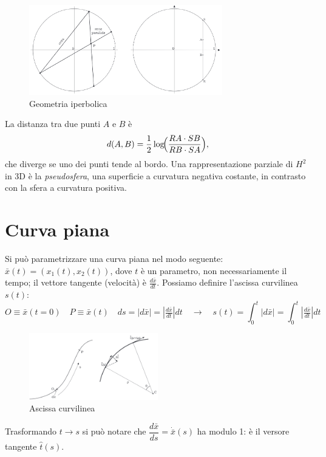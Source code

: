 \begin{figure}[H]
    \centering
    \includegraphics[width=0.75\textwidth]{assets/hyperbolic_geometry.png}
    \caption{Geometria iperbolica}
\end{figure}

La distanza tra due punti $A$ e $B$ è
$$
d(A,B) = \frac12 \log \!\Bigl(\frac{RA\cdot SB}{RB\cdot SA}\Bigr),
$$
che diverge se uno dei punti tende al bordo. Una rappresentazione parziale di $H^2$ in 3D è la \emph{pseudosfera}, una superficie a curvatura negativa costante, in contrasto con la sfera a curvatura positiva.

\section{Curva piana}

Si può parametrizzare una curva piana nel modo seguente: $\bar x(t) = (x_1(t), x_2(t))$, dove $t$ è un parametro, non necessariamente il tempo; il vettore tangente (velocità) è $\tfrac {d\bar x}{dt}$. Possiamo definire l'ascissa curvilinea $s(t)$:
$$
O \equiv \bar x(t = 0) \quad P \equiv \bar x(t) \quad ds = |d\bar x| = |\tfrac {d\bar x}{dt}| dt \quad \to \quad s(t) = \int_0^t |d\bar x| = \int_0^t |\tfrac {d\bar x}{dt}| dt
$$

\begin{figure}[H]
    \centering
    \includegraphics[width=0.5\textwidth]{assets/curve.png}
    \caption{Ascissa curvilinea}
\end{figure}

Trasformando $t \to s$ si può notare che $\dfrac{d\bar x}{ds} = \dot {\bar x}(s)$ ha modulo 1: è il versore tangente $\hat t(s)$.


